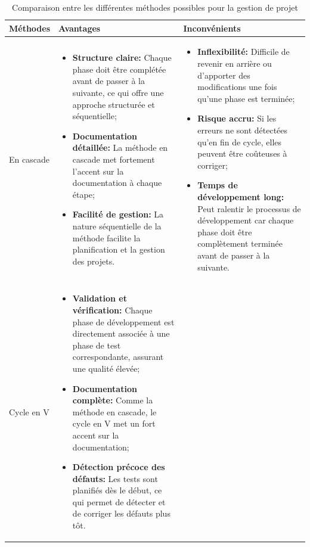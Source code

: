 \documentclass[12pt]{report}
\begin{document}
				\begin{longtable}{|p{3cm}|p{5.5cm}|p{5.5cm}|} 
						\caption{Comparaison entre les différentes méthodes possibles pour la gestion de projet \cite{Doc4Dev}} 
						\label{tab:agileVStrad}\\ 
						\hline 
						\textbf{Méthodes} & \textbf{Avantages} & \textbf{Inconvénients}\\ 
						\hline 
						\endfirsthead 	
						\endhead
						En cascade &
						\begin{itemize}
							\item \textbf{Structure claire:} Chaque phase doit être complétée avant de passer à la suivante, ce qui offre une approche structurée et séquentielle;
							\item \textbf{Documentation détaillée:} La méthode en cascade met fortement l'accent sur la documentation à chaque étape;
							\item \textbf{Facilité de gestion:} La nature séquentielle de la méthode facilite la planification et la gestion des projets.
						\end{itemize} &
						\begin{itemize}
							\item \textbf{Inflexibilité:} Difficile de revenir en arrière ou d'apporter des modifications une fois qu'une phase est terminée;
							\item \textbf{Risque accru:} Si les erreurs ne sont détectées qu'en fin de cycle, elles peuvent être coûteuses à corriger;
							\item \textbf{Temps de développement long:} Peut ralentir le processus de développement car chaque phase doit être complètement terminée avant de passer à la suivante.
						\end{itemize}\\
						\hline 
						Cycle en V &
						\begin{itemize}
							\item \textbf{Validation et vérification:} Chaque phase de développement est directement associée à une phase de test correspondante, assurant une qualité élevée;
							\item \textbf{Documentation complète:} Comme la méthode en cascade, le cycle en V met un fort accent sur la documentation;
							\item \textbf{Détection précoce des défauts:} Les tests sont planifiés dès le début, ce qui permet de détecter et de corriger les défauts plus tôt.
						\end{itemize} &
						\begin{itemize}

\end{itemize}
\end{longtable}
\end{document}
